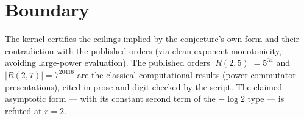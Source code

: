 \documentclass[11pt]{article}
\begin{document}
\section{Boundary}

The kernel certifies the ceilings implied by the conjecture's own
form and their contradiction with the published orders (via clean
exponent monotonicity, avoiding large-power evaluation). The
published orders $|R(2,5)| = 5^{34}$ and $|R(2,7)| = 7^{20416}$ are
the classical computational results (power-commutator
presentations), cited in prose and digit-checked by the script. The
claimed asymptotic form --- with its constant second term of the
$-\log 2$ type --- is refuted at $r = 2$.
\end{document}
